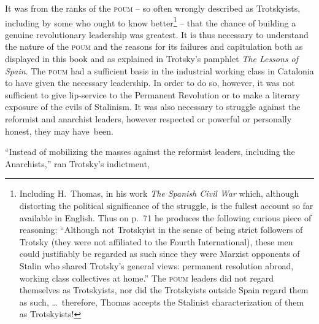It was from the ranks of the \indexPOUM\textsc{poum} -- so often wrongly described as Trotskyists, including by some who ought to know better\footnote{ Including H.~Thomas, in his work \emph{The Spanish Civil War} which, although distorting the political significance of the struggle, is the fullest account so far available in English. Thus on p.~71 he produces the following curious piece of reasoning: ``Although not Trotskyist in the sense of being strict followers of Trotsky (they were not affiliated to the Fourth International), these men could justifiably be regarded as such since they were Marxist opponents of Stalin who shared Trotsky’s general views: permanent resolution abroad, working class collectives at home.'' The \textsc{poum} leaders did not regard themselves as Trotskyists, nor did the Trotskyists outside Spain regard them as such, \dots\ therefore, Thomas accepts the Stalinist characterization of them as Trotskyists!} -- that the chance of building a genuine revolutionary leadership was greatest. It is thus necessary to understand the nature of the \textsc{poum} and the reasons for its failures and capitulation both as displayed in this book and as explained in Trotsky’s pamphlet \emph{The Lessons of Spain}. The \textsc{poum} had a sufficient basis in the industrial working class in Catalonia to have given the necessary leadership. In order to do so, however, it was not sufficient to give lip-service to the Permanent Revolution or to make a literary exposure of the evils of Stalinism. It was also necessary to struggle against the reformist and anarchist leaders, however respected or powerful or personally honest, they may have~been.

``Instead of mobilizing the masses against the reformist leaders, including the Anarchists,'' ran Trotsky’s indictment,

